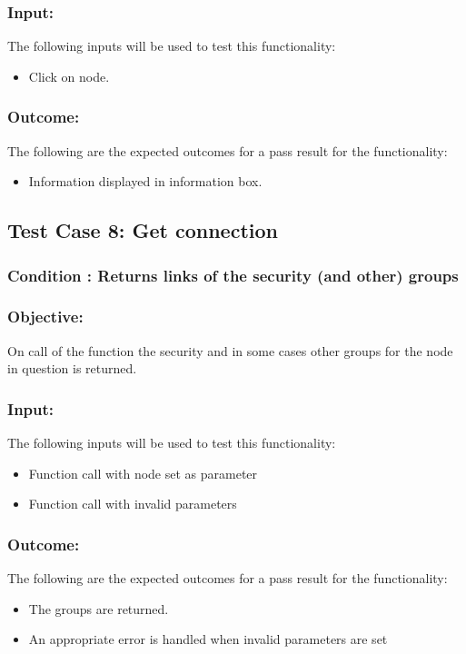 \documentclass[hidelinks,a4paper,12pt]{article}
\begin{document}
\subsubsection{Input:}
 The following inputs will be used to test this functionality:
\begin{itemize}
  \item Click on node.
  

\end{itemize}

\subsubsection{Outcome: }
The following are the expected outcomes for a pass result for the functionality:
\begin{itemize}
\item Information displayed in information box.

\end{itemize}

\subsection{Test Case 8: Get connection }
\subsubsection{Condition : Returns links of the security (and other) groups}
\subsubsection{Objective:} On call of the function the security and in some cases other groups for the node in question is returned. 

\subsubsection{Input:}
The following inputs will be used to test this functionality:
\begin{itemize}
	\item Function call with node set as parameter
	\item Function call with invalid parameters
	
	
\end{itemize}

\subsubsection{Outcome: }
The following are the expected outcomes for a pass result for the functionality:
\begin{itemize}
	\item The groups are returned.
	\item An appropriate error is handled when invalid parameters are set
	
\end{itemize}
\end{document}
